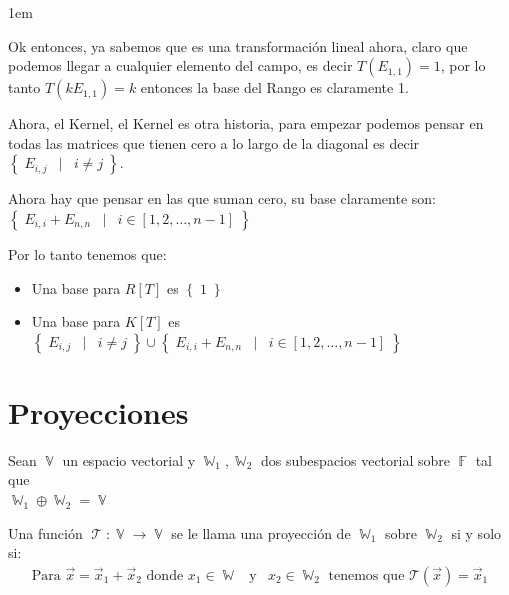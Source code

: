 \documentclass[12pt, fleqn]{report}                             %
\newenvironment{SmallIndentation}[1][0.75em]                    %
        {\begin{adjustwidth}{#1}{}\begin{footnotesize}}             %
        {\end{footnotesize}\end{adjustwidth}}                       %
\DeclareMathOperator \Space {\quad}                             %
\DeclareMathOperator \MiniSpace {\;}                            %
\newcommand \Such {\MiniSpace | \MiniSpace}                     %
\newcommand \Also {\MiniSpace \text{y} \MiniSpace}              %
\theoremstyle{break}                                            %
\DeclareMathOperator \GenericField {\mathbb{F}}                 %
\DeclareMathOperator \VectorSet    {\mathbb{V}}                 %
\DeclareMathOperator \SubVectorSet {\mathbb{W}}                 %
\DeclareMathOperator \LinTrans {\mathcal{T}}                    %
\newcommand{\Set}[1]    {\left\{ \; #1 \; \right\}}             %
\newcommand{\Wrap}[1]    {\left( #1 \right)}                    %
\newcommand{\FnLinTrans}[1]{\mathcal{T}\Wrap{#1}}               %
\begin{document}
\begin{itemize}
\begin{SmallIndentation}[1em]
                            Ok entonces, ya sabemos que es una transformación lineal
                            ahora, claro que podemos llegar a cualquier elemento del campo,
                            es decir $T(E_{1, 1}) = 1$, por lo tanto $T(kE_{1, 1}) = k$
                            entonces la base del Rango es claramente {1}.

                            Ahora, el Kernel, el Kernel es otra historia, para empezar podemos
                            pensar en todas las matrices que tienen cero a lo largo de la diagonal
                            es decir $\Set{E_{i, j} \Such i \neq j}$.

                            Ahora hay que pensar en las que suman cero, su base claramente son:
                            $\Set{E_{i, i} + E_{n, n} \Such i \in [1, 2, \dots, n - 1]}$

                            Por lo tanto tenemos que:
                            \begin{itemize}
                                \item Una base para $R[T]$ es $\Set{1}$
                                \item Una base para $K[T]$ es $\Set{E_{i, j} \Such i \neq j} \cup 
                                    \Set{E_{i, i} + E_{n, n} \Such i \in [1, 2, \dots, n - 1]}$
                            \end{itemize}
                        
                        \end{SmallIndentation}


                \end{itemize}

                        


        \clearpage
        \section{Proyecciones}

            
            Sean $\VectorSet$ un espacio vectorial y $\SubVectorSet_1, \SubVectorSet_2$ dos subespacios 
            vectorial sobre $\GenericField$ tal que \\
            $\SubVectorSet_1 \oplus \SubVectorSet_2 = \VectorSet$ 

            Una función $\LinTrans: \VectorSet \to \VectorSet$ se le llama una proyección
            de $\SubVectorSet_1$ sobre $\SubVectorSet_2$ si y solo si:
            \begin{align*}
                \text{Para } 
                    \vec x = \vec x_1 + \vec x_2 \text{ donde } 
                    x_1 \in \SubVectorSet \Also
                    x_2 \in \SubVectorSet_2
                    \text{ tenemos que }
                    \FnLinTrans{\vec x} = \vec x_1
            \end{align*}
\end{document}

